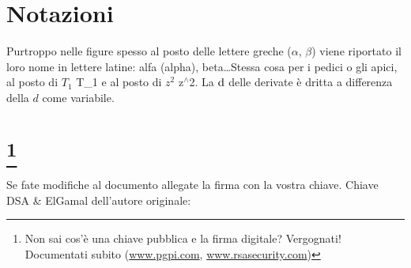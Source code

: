 \section*{\centering Notazioni}
Purtroppo nelle figure spesso al posto delle lettere greche ($\alpha$, $\beta$) viene riportato il loro nome in lettere latine: alfa (alpha), beta\ldots Stessa cosa per i pedici o gli apici, al posto di $T_1$ T\_1 e al posto di $z^2$ z$^\wedge$2. La $\mathrm{d}$ delle derivate è dritta a differenza della $d$ come variabile.
\newpage
\section*{\protect\footnote{Non sai cos'è una chiave pubblica e la firma digitale? Vergognati! Documentati subito (\href{http://www.pgpi.com}{www.pgpi.com}, \href{http://www.rsasecurity.com}{www.rsasecurity.com})}}
Se fate modifiche al documento allegate la firma con la vostra chiave.
Chiave DSA \& ElGamal dell'autore originale:

